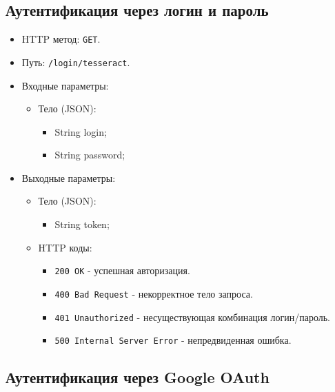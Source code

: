 \documentclass[a4paper, 14pt]{article}
\begin{document}
\subsection{Аутентификация через логин и пароль}

\begin{itemize}
    \item HTTP метод: \texttt{GET}.
    \item Путь: \texttt{/login/tesseract}.
    \item Входные параметры:
    \begin{itemize}
        \item Тело (JSON):
        \begin{itemize}
            \item String login;
            \item String password;
        \end{itemize}
    \end{itemize}
    \item Выходные параметры:
    \begin{itemize}
        \item Тело (JSON):
        \begin{itemize}
            \item String token;
        \end{itemize}
        \item HTTP коды:
        \begin{itemize}
            \item \texttt{200 OK} - успешная авторизация.
            \item \texttt{400 Bad Request} - некорректное тело запроса.
            \item \texttt{401 Unauthorized} - несуществующая комбинация логин/пароль.
            \item \texttt{500 Internal Server Error} - непредвиденная ошибка.
        \end{itemize}
    \end{itemize}
\end{itemize}

\subsection{Аутентификация через Google OAuth}
\end{document}

